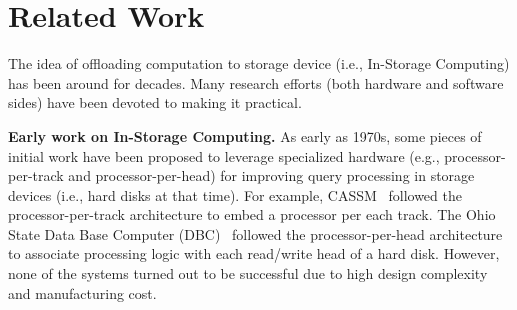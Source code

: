 
\section{Related Work}\label{sec:relatedWork}
The idea of offloading computation to storage device (i.e., In-Storage Computing) has been around for decades. Many research efforts (both hardware and software sides) have been devoted to making it practical.




\textbf{Early work on In-Storage Computing.} As early as 1970s, some pieces of initial work have been proposed to leverage specialized hardware (e.g., processor-per-track and processor-per-head) for improving query processing in storage devices (i.e., hard disks at that time). For example, CASSM~\cite{Su1975} %
followed the processor-per-track architecture to embed a processor per each track. 
The Ohio State Data Base Computer (DBC)~\cite{Kannan1978}  %
followed the processor-per-head architecture to associate processing logic with each read/write head of a hard disk. However, none of the systems turned out to be successful due to high design complexity and manufacturing cost.

